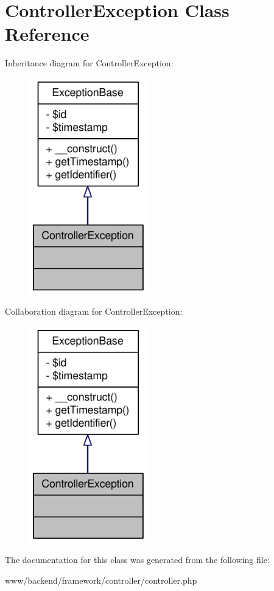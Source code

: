 \hypertarget{classControllerException}{
\section{ControllerException Class Reference}
\label{classControllerException}
}


Inheritance diagram for ControllerException:\nopagebreak
\begin{figure}[H]
\begin{center}
\leavevmode
\includegraphics[width=144pt]{classControllerException__inherit__graph}
\end{center}
\end{figure}


Collaboration diagram for ControllerException:\nopagebreak
\begin{figure}[H]
\begin{center}
\leavevmode
\includegraphics[width=144pt]{classControllerException__coll__graph}
\end{center}
\end{figure}


The documentation for this class was generated from the following file:\begin{DoxyCompactItemize}
\item 
www/backend/framework/controller/controller.php\end{DoxyCompactItemize}
